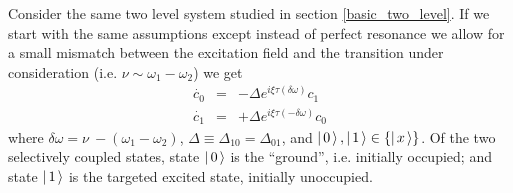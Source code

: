 \label{doppler section}
Consider the same two level system studied in section \ref{basic_two_level}. If we start with the same assumptions except instead of perfect resonance we allow for a small mismatch between the excitation field and the transition under consideration (i.e. $\nu\sim\omega_1-\omega_2$) we get
\begin{subequations}
\begin{eqnarray}
\dot{c_0}
&=&
-\Delta
e^{i \xi \tau (\delta \omega)}
c_1
\\
\dot{c_1}
&=&
+\Delta
e^{i \xi \tau (-\delta \omega)}
c_0
\end{eqnarray}
\label{doppler eom}
\end{subequations}
where $\delta \omega = \nu\ - (\omega_1-\omega_2)$, $\Delta\equiv\Delta_{10}=\Delta_{01}$, and $\left| \hspace{0.15em} 0 \hspace{0.15em}\right\rangle,\left| \hspace{0.15em} 1 \hspace{0.15em}\right\rangle\in\{\left| \hspace{0.15em} x \hspace{0.15em}\right\rangle\}$. Of the two selectively coupled states, state $\left| \hspace{0.15em} 0 \hspace{0.15em}\right\rangle$ is the ``ground'', i.e. initially occupied; and state $\left| \hspace{0.15em} 1 \hspace{0.15em}\right\rangle$ is the targeted excited state, initially unoccupied.

